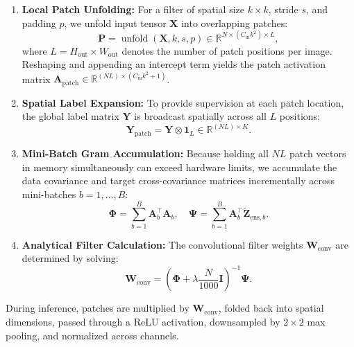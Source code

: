 \documentclass[journal]{IEEEtran}
\begin{document}
\begin{enumerate}
    \item \textbf{Local Patch Unfolding:} For a filter of spatial size $k \times k$, stride $s$, and padding $p$, we unfold input tensor $\mathbf{X}$ into overlapping patches:
    \begin{equation}
    \mathbf{P} = \operatorname{unfold}(\mathbf{X}, k, s, p) \in \mathbb{R}^{N \times (C_{\text{in}} k^2) \times L},
    \end{equation}
    where $L = H_{\text{out}} \times W_{\text{out}}$ denotes the number of patch positions per image. Reshaping and appending an intercept term yields the patch activation matrix $\mathbf{A}_{\text{patch}} \in \mathbb{R}^{(N L) \times (C_{\text{in}} k^2 + 1)}$.
    
    \item \textbf{Spatial Label Expansion:} To provide supervision at each patch location, the global label matrix $\mathbf{Y}$ is broadcast spatially across all $L$ positions:
    \begin{equation}
    \mathbf{Y}_{\text{patch}} = \mathbf{Y} \otimes \mathbf{1}_L \in \mathbb{R}^{(N L) \times K}.
    \end{equation}
    
    \item \textbf{Mini-Batch Gram Accumulation:} Because holding all $N L$ patch vectors in memory simultaneously can exceed hardware limits, we accumulate the data covariance and target cross-covariance matrices incrementally across mini-batches $b = 1, \dots, B$:
    \begin{equation}
    \mathbf{\Phi} = \sum_{b=1}^B \mathbf{A}_b^\top \mathbf{A}_b, \quad \mathbf{\Psi} = \sum_{b=1}^B \mathbf{A}_b^\top \tilde{\mathbf{Z}}_{\text{ens}, b}.
    \end{equation}
    
    \item \textbf{Analytical Filter Calculation:} The convolutional filter weights $\mathbf{W}_{\text{conv}}$ are determined by solving:
    \begin{equation}
    \mathbf{W}_{\text{conv}} = \left( \mathbf{\Phi} + \lambda \frac{N}{1000} \mathbf{I} \right)^{-1} \mathbf{\Psi}.
    \end{equation}
\end{enumerate}

During inference, patches are multiplied by $\mathbf{W}_{\text{conv}}$, folded back into spatial dimensions, passed through a ReLU activation, downsampled by $2 \times 2$ max pooling, and normalized across channels.
\end{document}
